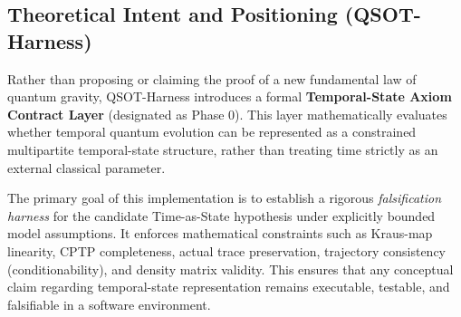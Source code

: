 
\subsection{Theoretical Intent and Positioning (QSOT-Harness)}
Rather than proposing or claiming the proof of a new fundamental law of quantum gravity, QSOT-Harness introduces a formal \textbf{Temporal-State Axiom Contract Layer} (designated as Phase 0). This layer mathematically evaluates whether temporal quantum evolution can be represented as a constrained multipartite temporal-state structure, rather than treating time strictly as an external classical parameter. 

The primary goal of this implementation is to establish a rigorous \textit{falsification harness} for the candidate Time-as-State hypothesis under explicitly bounded model assumptions. It enforces mathematical constraints such as Kraus-map linearity, CPTP completeness, actual trace preservation, trajectory consistency (conditionability), and density matrix validity. This ensures that any conceptual claim regarding temporal-state representation remains executable, testable, and falsifiable in a software environment.
